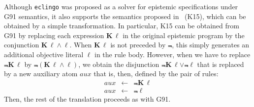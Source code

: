 \documentclass{new_tlp}
\def\K{\mathbf{K}\, }
\def\eclingo{{\tt eclingo}}
\def\bL{\K}
\begin{document}
Although \eclingo{} was proposed as a solver for epistemic specifications under G91 semantics, it also supports
the semantics proposed in~\cite{kawabagezh15} (K15), which can be obtained by a simple transformation.
%
In particular, K15 can be obtained from G91 by replacing each expression $\bL \ell$ in the original epistemic program by the conjunction $\bL \ell \wedge \ell$.
%
When $\bL \ell$ is not preceded by $\Not$, this simply generates an additional objective literal $\ell$ in the rule body.
%
However, when we have to replace $\Not \bL \ell$ by $\Not (\bL \ell \wedge \ell)$, we obtain the disjunction $\Not \bL \ell \vee \Not \ell$ that is replaced by a new auxiliary atom $\mathit{aux}$ that is, then, defined by the pair of rules:
\begin{eqnarray*}
\mathit{aux} & \leftarrow & \Not \bL \ell \\
\mathit{aux} & \leftarrow & \Not \ell
\end{eqnarray*}
Then, the rest of the translation proceeds as with G91.
\end{document}

